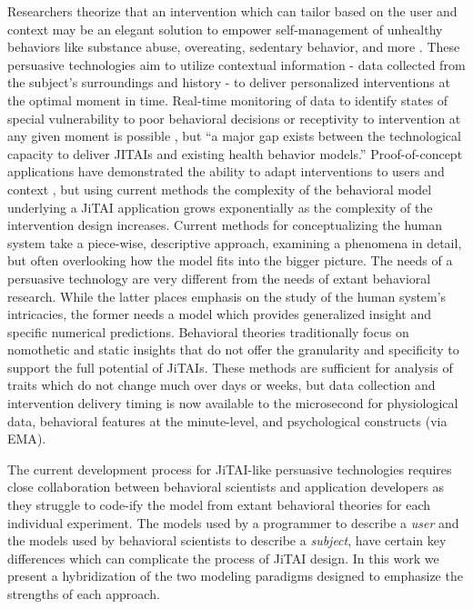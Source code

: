 \documentclass[runningheads,a4paper]{llncs}
\begin{document}
Researchers theorize that an intervention which can tailor based on the user and context may be an elegant solution to empower self-management of unhealthy behaviors like substance abuse, overeating, sedentary behavior, and more \cite{nahum2014}.
These persuasive technologies aim to utilize contextual information - data collected from the subject's surroundings and history - to deliver personalized interventions at the optimal moment in time.
Real-time monitoring of data to identify states of special vulnerability to poor behavioral decisions or receptivity to intervention at any given moment is possible \cite{hekler2013realizing}, but ``a major gap exists between the technological capacity to deliver JITAIs and existing health behavior models.'' \cite{nahum2014}
Proof-of-concept applications have demonstrated the ability to adapt interventions to users \cite{dallery2014optimizing, beck2010challenges} and context \cite{brailsford2010towards, collins2004conceptual}, but using current methods the complexity of the behavioral model underlying a JiTAI application grows exponentially as the complexity of the intervention design increases. 
Current methods for conceptualizing the human system take a piece-wise, descriptive approach, examining a phenomena in detail, but often overlooking how the model fits into the bigger picture.
The needs of a persuasive technology are very different from the needs of extant behavioral research.
While the latter places emphasis on the study of the human system's intricacies, the former needs a model which provides generalized insight and specific numerical predictions.
Behavioral theories traditionally focus on nomothetic and static insights that do not offer the granularity and specificity to support the full potential of JiTAIs\cite{riley2011healthbehavior}.
These methods are sufficient for analysis of traits which do not change much over days or weeks, but data collection and intervention delivery timing is now available to the microsecond for physiological data, behavioral features at the minute-level, and psychological constructs (via EMA\cite{shiffman2008ecological}).

The current development process for JiTAI-like persuasive technologies requires close collaboration between behavioral scientists and application developers as they struggle to code-ify the model from extant behavioral theories for each individual experiment.
The models used by a programmer to describe a \emph{user} and the models used by behavioral scientists to describe a \emph{subject}, have certain key differences which can complicate the process of JiTAI design.
In this work we present a hybridization of the two modeling paradigms designed to emphasize the strengths of each approach.
\end{document}
